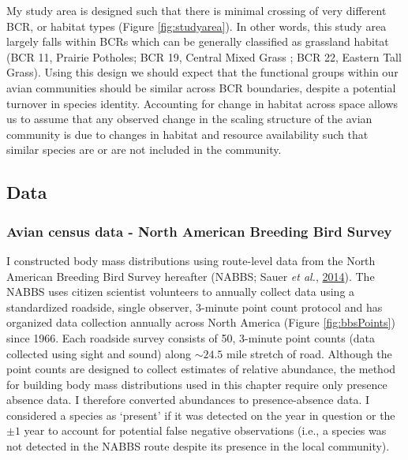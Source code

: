 \documentclass[print]{nuthesis}
\begin{document}
My study area is designed such that there is minimal crossing of very different BCR, or habitat types (Figure \ref{fig:studyarea}). In other words, this study area largely falls within BCRs which can be generally classified as grassland habitat (BCR 11, Prairie Potholes; BCR 19, Central Mixed Grass ; BCR 22, Eastern Tall Grass). Using this design we should expect that the functional groups within our avian communities should be similar across BCR boundaries, despite a potential turnover in species identity. Accounting for change in habitat across space allows us to assume that any observed change in the scaling structure of the avian community is due to changes in habitat and resource availability such that similar species are or are not included in the community.

\hypertarget{data}{%
\subsection{Data}\label{data}}

\hypertarget{avian-census-data---north-american-breeding-bird-survey}{%
\subsubsection{Avian census data - North American Breeding Bird Survey}\label{avian-census-data---north-american-breeding-bird-survey}}

I constructed body mass distributions using route-level data from the North American Breeding Bird Survey hereafter (NABBS; Sauer \emph{et al.}, \protect\hyperlink{ref-sauer2017results}{2014}). The NABBS uses citizen scientist volunteers to annually collect data using a standardized roadside, single observer, 3-minute point count protocol and has organized data collection annually across North America (Figure \ref{fig:bbsPoints}) since 1966. Each roadside survey consists of 50, 3-minute point counts (data collected using sight and sound) along \(\sim24.5\) mile stretch of road. Although the point counts are designed to collect estimates of relative abundance, the method for building body mass distributions used in this chapter require only presence absence data. I therefore converted abundances to presence-absence data. I considered a species as `present' if it was detected on the year in question or the \(\pm 1\) year to account for potential false negative observations (i.e., a species was not detected in the NABBS route despite its presence in the local community).
\end{document}
